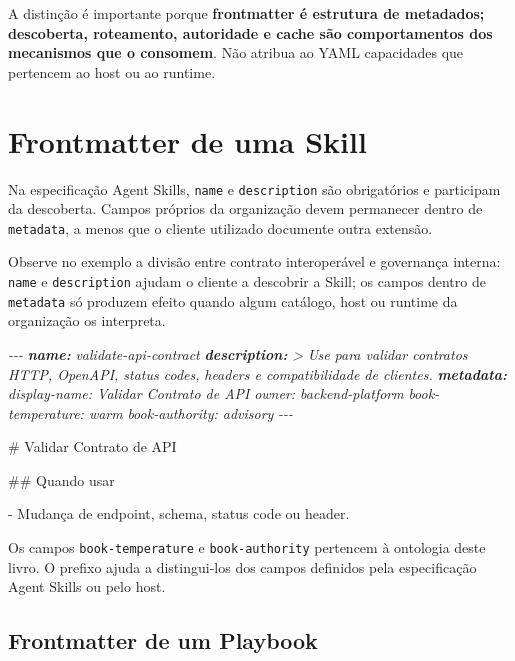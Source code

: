\documentclass[
  10pt,
  a4paper,
  oneside]{book}
\newenvironment{Shaded}{}{}
\newcommand{\AnnotationTok}[1]{\textcolor[rgb]{0.38,0.63,0.69}{\textbf{\textit{#1}}}}
\newcommand{\CommentTok}[1]{\textcolor[rgb]{0.38,0.63,0.69}{\textit{#1}}}
\newcommand{\FunctionTok}[1]{\textcolor[rgb]{0.02,0.16,0.49}{#1}}
\newcommand{\NormalTok}[1]{#1}
\newcommand{\SpecialStringTok}[1]{\textcolor[rgb]{0.73,0.40,0.53}{#1}}
\renewenvironment{Shaded}{\begin{snugshade}}{\end{snugshade}}%
\begin{document}
A distinção é importante porque \textbf{frontmatter é estrutura de
metadados; descoberta, roteamento, autoridade e cache são comportamentos
dos mecanismos que o consomem}. Não atribua ao YAML capacidades que
pertencem ao host ou ao runtime.

\hypertarget{frontmatter-de-uma-skill}{%
\section{Frontmatter de uma Skill}\label{frontmatter-de-uma-skill}}

Na especificação Agent Skills, \texttt{name} e \texttt{description} são
obrigatórios e participam da descoberta. Campos próprios da organização
devem permanecer dentro de \texttt{metadata}, a menos que o cliente
utilizado documente outra extensão.

Observe no exemplo a divisão entre contrato interoperável e governança
interna: \texttt{name} e \texttt{description} ajudam o cliente a
descobrir a Skill; os campos dentro de \texttt{metadata} só produzem
efeito quando algum catálogo, host ou runtime da organização os
interpreta.

\begin{Shaded}
\begin{Highlighting}[]
\CommentTok{{-}{-}{-}}
\AnnotationTok{name:}\CommentTok{ validate{-}api{-}contract}
\AnnotationTok{description:}\CommentTok{ \textgreater{}}
\CommentTok{  Use para validar contratos HTTP, OpenAPI, status codes,}
\CommentTok{  headers e compatibilidade de clientes.}
\AnnotationTok{metadata:}
\CommentTok{  display{-}name: Validar Contrato de API}
\CommentTok{  owner: backend{-}platform}
\CommentTok{  book{-}temperature: warm}
\CommentTok{  book{-}authority: advisory}
\CommentTok{{-}{-}{-}}

\FunctionTok{\# Validar Contrato de API}

\FunctionTok{\#\# Quando usar}

\SpecialStringTok{{-} }\NormalTok{Mudança de endpoint, schema, status code ou header.}
\end{Highlighting}
\end{Shaded}

Os campos \texttt{book-temperature} e \texttt{book-authority} pertencem
à ontologia deste livro. O prefixo ajuda a distingui-los dos campos
definidos pela especificação Agent Skills ou pelo host.

\hypertarget{frontmatter-de-um-playbook}{%
\subsection{Frontmatter de um
Playbook}\label{frontmatter-de-um-playbook}}
\end{document}

